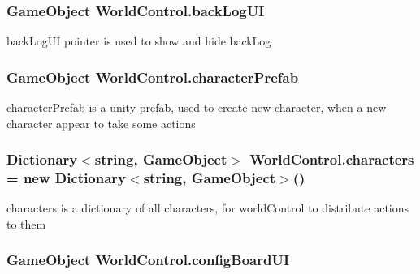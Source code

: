 \subsubsection[{\texorpdfstring{back\+Log\+UI}{backLogUI}}]{\setlength{\rightskip}{0pt plus 5cm}Game\+Object World\+Control.\+back\+Log\+UI}\hypertarget{class_world_control_ab49f9b8f28feb542edd927984c32ac1c}{}\label{class_world_control_ab49f9b8f28feb542edd927984c32ac1c}


back\+Log\+UI pointer is used to show and hide back\+Log 

\subsubsection[{\texorpdfstring{character\+Prefab}{characterPrefab}}]{\setlength{\rightskip}{0pt plus 5cm}Game\+Object World\+Control.\+character\+Prefab}\hypertarget{class_world_control_af951d6403f0090baafc0ddc1fdc7645d}{}\label{class_world_control_af951d6403f0090baafc0ddc1fdc7645d}


character\+Prefab is a unity prefab, used to create new character, when a new character appear to take some actions 

\subsubsection[{\texorpdfstring{characters}{characters}}]{\setlength{\rightskip}{0pt plus 5cm}Dictionary$<$string, Game\+Object$>$ World\+Control.\+characters = new Dictionary$<$string, Game\+Object$>$()}\hypertarget{class_world_control_a01b7489307ad256a65a5020d046fcf7b}{}\label{class_world_control_a01b7489307ad256a65a5020d046fcf7b}


characters is a dictionary of all characters, for world\+Control to distribute actions to them 

\subsubsection[{\texorpdfstring{config\+Board\+UI}{configBoardUI}}]{\setlength{\rightskip}{0pt plus 5cm}Game\+Object World\+Control.\+config\+Board\+UI}\hypertarget{class_world_control_a8379797a66eb1e448b3e47f4584b70c4}{}\label{class_world_control_a8379797a66eb1e448b3e47f4584b70c4}


